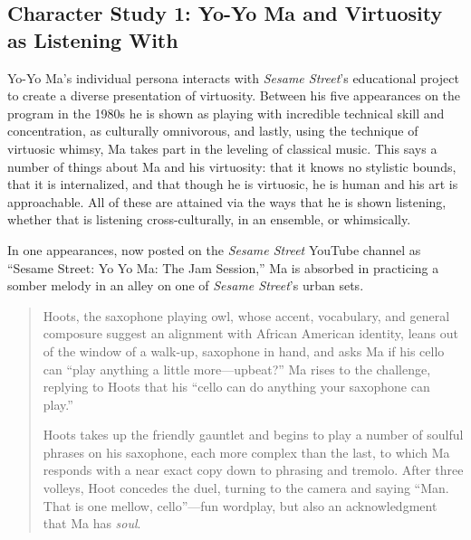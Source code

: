 \documentclass[12pt,letterpaper]{article}
\newcommand{\ses}{\textit{Sesame Street }}
\begin{document}
	\subsection*{Character Study 1: Yo-Yo Ma and Virtuosity as 
	Listening With} 

	Yo-Yo Ma's individual persona interacts with \textit{Sesame Street}'s
	educational project to create a diverse presentation of virtuosity. 
	Between his five appearances on the program in the 1980s he is shown as 
	playing with incredible technical skill and concentration, as 
	culturally omnivorous, and lastly, using the technique of virtuosic 
	whimsy, Ma 
	takes part in the leveling of classical music. This says a number of 
	things about Ma and his virtuosity: that it knows no stylistic bounds,
	that it is internalized, and that though he is virtuosic, he is 
	human
	and his art is approachable. All of these are attained via the ways
	that he is shown listening, whether that is listening 
	cross-culturally, in an ensemble, or whimsically.  
	
	In one appearances, now posted on the 
	\ses YouTube channel as ``Sesame Street: Yo Yo Ma: The Jam Session,'' 
	Ma is absorbed in practicing a somber melody in an alley on one of 
	\textit{Sesame Street}'s urban sets.

	\begin{quote}	

	\ttfamily

	Hoots, the saxophone playing owl, whose accent, vocabulary, and general
	composure suggest an alignment with African American identity, leans out
	of the window of a walk-up, saxophone in hand, and asks Ma if his cello
	can ``play anything a little more---upbeat?'' Ma rises to the challenge,
	replying to Hoots that his ``cello can do anything your saxophone can 
	play.''

	Hoots takes up the friendly gauntlet and begins to play a number of 
	soulful phrases on his saxophone, each more complex than the last, to 
	which Ma responds with a near exact copy down to phrasing and tremolo. 
	After three volleys, Hoot concedes the duel, turning to the camera and 
	saying ``Man. That is one mellow, cello''---fun wordplay, but also an 
	acknowledgment that Ma has \textit{soul}.

	\end{quote}
\end{document}
